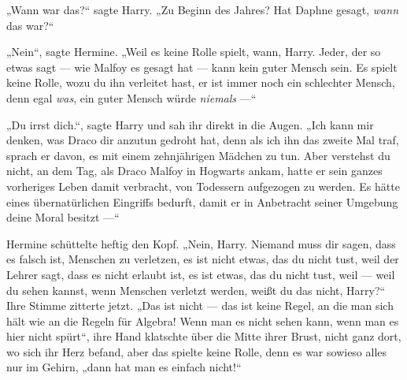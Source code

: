 „Wann war das?“ sagte Harry.
„Zu Beginn des Jahres? Hat Daphne gesagt, \emph{wann} das war?“

„Nein“, sagte Hermine.
„Weil es keine Rolle spielt, wann, Harry. Jeder, der so etwas sagt — wie Malfoy es gesagt hat — kann kein guter Mensch sein. Es spielt keine Rolle, wozu du ihn verleitet hast, er ist immer noch ein schlechter Mensch, denn egal \emph{was}, ein guter Mensch würde \emph{niemals} —“

„Du irrst dich.“, sagte Harry und sah ihr direkt in die Augen.
„Ich kann mir denken, was Draco dir anzutun gedroht hat, denn als ich ihn das zweite Mal traf, sprach er davon, es mit einem zehnjährigen Mädchen zu tun. Aber verstehst du nicht, an dem Tag, als Draco Malfoy in Hogwarts ankam, hatte er sein ganzes vorheriges Leben damit verbracht, von Todessern aufgezogen zu werden. Es hätte eines übernatürlichen Eingriffs bedurft, damit er in Anbetracht seiner Umgebung deine Moral besitzt —“

Hermine schüttelte heftig den Kopf.
„Nein, Harry. Niemand muss dir sagen, dass es falsch ist, Menschen zu verletzen, es ist nicht etwas, das du nicht tust, weil der Lehrer sagt, dass es nicht erlaubt ist, es ist etwas, das du nicht tust, weil — weil du sehen kannst, wenn Menschen verletzt werden, weißt du das nicht, Harry?“
Ihre Stimme zitterte jetzt.
„Das ist nicht — das ist keine Regel, an die man sich hält wie an die Regeln für Algebra! Wenn man es nicht sehen kann, wenn man es hier nicht spürt“, ihre Hand klatschte über die Mitte ihrer Brust, nicht ganz dort, wo sich ihr Herz befand, aber das spielte keine Rolle, denn es war sowieso alles nur im Gehirn, „dann hat man es einfach nicht!“

